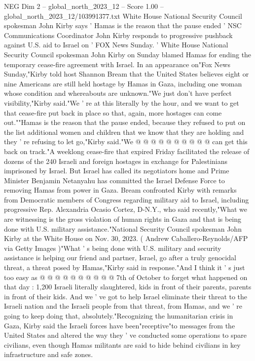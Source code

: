 \begin{textsample}{NEG Dim 2 – global\_north\_2023\_12 – Score 1.00 – global\_north\_2023\_12/103991377.txt}  \label{ex:f2_neg_211}
White House National Security Council spokesman John Kirby says ' Hamas is the reason that the pause ended ' NSC Communications Coordinator John Kirby responds to progressive pushback against U.S. aid to Israel on ' FOX News Sunday. ' White House National Security Council spokesman John Kirby on Sunday blamed Hamas for ending the temporary cease-fire agreement with Israel.
In an appearance on"Fox News Sunday,"Kirby told host Shannon Bream that the United States believes eight or nine Americans are still held hostage by Hamas in Gaza, including one woman whose condition and whereabouts are unknown."We just don't have perfect visibility,"Kirby said."We ' re at this literally by the hour, and we want to get that cease-fire put back in place so that, again, more hostages can come out.""Hamas is the reason that the pause ended, because they refused to put on the list additional women and children that we know that they are holding and they ' re refusing to let go,"Kirby said."We @ @ @ @ @ @ @ @ @ @ can get this back on track."A weeklong cease-fire that expired Friday facilitated the release of dozens of the 240 Israeli and foreign hostages in exchange for Palestinians imprisoned by Israel.
But Israel has called its negotiators home and Prime Minister Benjamin Netanyahu has committed the Israel Defense Force to removing Hamas from power in Gaza.
Bream confronted Kirby with remarks from Democratic members of Congress regarding military aid to Israel, including progressive Rep.
Alexandria Ocasio Cortez, D-N.Y., who said recently,"What we are witnessing is the gross violation of human rights in Gaza and that is being done with U.S. military assistance."National Security Council spokesman John Kirby at the White House on Nov. 30, 2023. ( Andrew Caballero-Reynolds/AFP via Getty Images )"What ' s being done with U.S. military and security assistance is helping our friend and partner, Israel, go after a truly genocidal threat, a threat posed by Hamas,"Kirby said in response."And I think it ' s just too easy as @ @ @ @ @ @ @ @ @ @ 7th of October to forget what happened on that day : 1,200 Israeli literally slaughtered, kids in front of their parents, parents in front of their kids.
And we ' ve got to help Israel eliminate their threat to the Israeli nation and the Israeli people from that threat, from Hamas, and we ' re going to keep doing that, absolutely."Recognizing the humanitarian crisis in Gaza, Kirby said the Israeli forces have been"receptive"to messages from the United States and altered the way they ' ve conducted some operations to spare civilians, even though Hamas militants are said to hide behind civilians in key infrastructure and safe zones.

\end{textsample}
